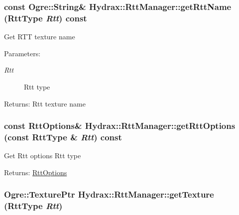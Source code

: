 \begin{CompactItemize}
{\subsubsection[{getRttName}]{\setlength{\rightskip}{0pt plus 5cm}const Ogre::String\& Hydrax::RttManager::getRttName ({\bf RttType} {\em Rtt}) const}}
\label{class_hydrax_1_1_rtt_manager_dc5af0a29c8e491e8ea9fba6349e208c}


Get RTT texture name \begin{Desc}
\item[Parameters:]
\begin{description}
\item[{\em Rtt}]Rtt type \end{description}
\end{Desc}
\begin{Desc}
\item[Returns:]Rtt texture name \end{Desc}
\hypertarget{class_hydrax_1_1_rtt_manager_3d6990b4cbbe6da2e1580b289f5329fd}{
\subsubsection[{getRttOptions}]{\setlength{\rightskip}{0pt plus 5cm}const {\bf RttOptions}\& Hydrax::RttManager::getRttOptions (const {\bf RttType} \& {\em Rtt}) const}}
\label{class_hydrax_1_1_rtt_manager_3d6990b4cbbe6da2e1580b289f5329fd}


Get Rtt options  Rtt type \begin{Desc}
\item[Returns:]\hyperlink{struct_hydrax_1_1_rtt_manager_1_1_rtt_options}{RttOptions} \end{Desc}
\hypertarget{class_hydrax_1_1_rtt_manager_4e672cd4cf5361c48e75b559f841602c}{
\subsubsection[{getTexture}]{\setlength{\rightskip}{0pt plus 5cm}Ogre::TexturePtr Hydrax::RttManager::getTexture ({\bf RttType} {\em Rtt})}}
\label{class_hydrax_1_1_rtt_manager_4e672cd4cf5361c48e75b559f841602c}



\end{CompactItemize}
